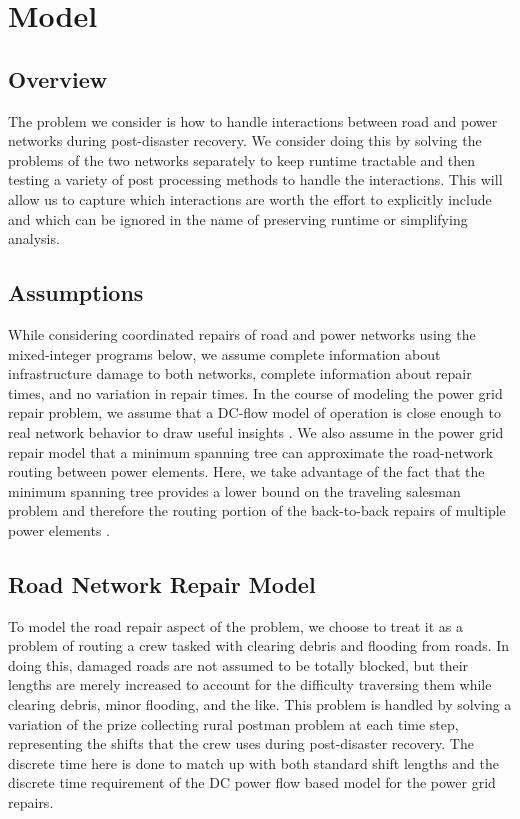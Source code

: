 \documentclass[10pt]{article}
\newcounter{step}
\begin{document}
\section{\large{Model}}
\vspace*{-12pt}
\subsection{Overview}
The problem we consider is how to handle interactions between road and power networks during post-disaster recovery. We consider doing this by solving the problems of the two networks separately to keep runtime tractable and then testing a variety of post processing methods to handle the interactions. This will allow us to capture which interactions are worth the effort to explicitly include and which can be ignored in the name of preserving runtime or simplifying analysis. 
\subsection{Assumptions}
\vspace*{-12pt}
While considering coordinated repairs of road and power networks using the mixed-integer programs below, we assume complete information about infrastructure damage to both networks, complete information about repair times, and no variation in repair times. In the course of modeling the power grid repair problem, we assume that a DC-flow model of operation is close enough to real network behavior to draw useful insights \cite{QiEA2012}. We also assume in the power grid repair model that a minimum spanning tree can approximate the road-network routing between power elements. Here, we take advantage of the fact that the minimum spanning tree provides a lower bound on the traveling salesman problem and therefore the routing portion of the back-to-back repairs of multiple power elements .
\subsection{Road Network Repair Model}
\vspace*{-12pt}
To model the road repair aspect of the problem, we choose to treat it as a problem of routing a crew tasked with clearing debris and flooding from roads. In doing this, damaged roads are not assumed to be totally blocked, but their lengths are merely increased to account for the difficulty traversing them while clearing debris, minor flooding, and the like. This problem is handled by solving a variation of the prize collecting rural postman problem at each time step, representing the shifts that the crew uses during post-disaster recovery. The discrete time here is done to match up with both standard shift lengths and the discrete time requirement of the DC power flow based model for the power grid repairs. 
\end{document}
